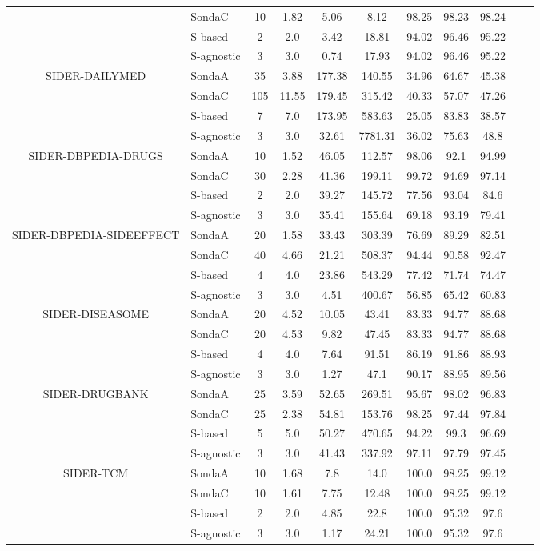 \begin{center}
\begin{table*}[h]
\begin{tabular}{|c|l|c|c|c|c|c|c|c|c|c|}
 & SondaC  & 10 & 1.82   & 5.06  & 8.12 & 98.25 & 98.23 & 98.24  \\
 & S-based  & 2 & 2.0   & 3.42  & 18.81 & 94.02 & 96.46 & 95.22  \\
 & S-agnostic  & 3 & 3.0   & 0.74  & 17.93 & 94.02 & 96.46 & 95.22  \\ \hline
\multirow{4}{*}{SIDER-DAILYMED}  & SondaA  & 35 & 3.88   & 177.38  & 140.55 & 34.96 & 64.67 & 45.38  \\
 & SondaC  & 105 & 11.55   & 179.45  & 315.42 & 40.33 & 57.07 & 47.26  \\
 & S-based  & 7 & 7.0   & 173.95  & 583.63 & 25.05 & 83.83 & 38.57  \\
 & S-agnostic  & 3 & 3.0   & 32.61  & 7781.31 & 36.02 & 75.63 & 48.8  \\ \hline
\multirow{4}{*}{SIDER-DBPEDIA-DRUGS}  & SondaA  & 10 & 1.52   & 46.05  & 112.57 & 98.06 & 92.1 & 94.99  \\
 & SondaC  & 30 & 2.28   & 41.36  & 199.11 & 99.72 & 94.69 & 97.14  \\
 & S-based  & 2 & 2.0   & 39.27  & 145.72 & 77.56 & 93.04 & 84.6  \\
 & S-agnostic  & 3 & 3.0   & 35.41  & 155.64 & 69.18 & 93.19 & 79.41  \\ \hline
\multirow{4}{*}{SIDER-DBPEDIA-SIDEEFFECT}  & SondaA  & 20 & 1.58   & 33.43  & 303.39 & 76.69 & 89.29 & 82.51  \\
 & SondaC  & 40 & 4.66   & 21.21  & 508.37 & 94.44 & 90.58 & 92.47  \\
 & S-based  & 4 & 4.0   & 23.86  & 543.29 & 77.42 & 71.74 & 74.47  \\
 & S-agnostic  & 3 & 3.0   & 4.51  & 400.67 & 56.85 & 65.42 & 60.83  \\ \hline
\multirow{4}{*}{SIDER-DISEASOME}  & SondaA  & 20 & 4.52   & 10.05  & 43.41 & 83.33 & 94.77 & 88.68  \\
 & SondaC  & 20 & 4.53   & 9.82  & 47.45 & 83.33 & 94.77 & 88.68  \\
 & S-based  & 4 & 4.0   & 7.64  & 91.51 & 86.19 & 91.86 & 88.93  \\
 & S-agnostic  & 3 & 3.0   & 1.27  & 47.1 & 90.17 & 88.95 & 89.56  \\ \hline
\multirow{4}{*}{SIDER-DRUGBANK}  & SondaA  & 25 & 3.59   & 52.65  & 269.51 & 95.67 & 98.02 & 96.83  \\
 & SondaC  & 25 & 2.38   & 54.81  & 153.76 & 98.25 & 97.44 & 97.84  \\
 & S-based  & 5 & 5.0   & 50.27  & 470.65 & 94.22 & 99.3 & 96.69  \\
 & S-agnostic  & 3 & 3.0   & 41.43  & 337.92 & 97.11 & 97.79 & 97.45  \\ \hline
\multirow{4}{*}{SIDER-TCM}  & SondaA  & 10 & 1.68   & 7.8  & 14.0 & 100.0 & 98.25 & 99.12  \\
 & SondaC  & 10 & 1.61   & 7.75  & 12.48 & 100.0 & 98.25 & 99.12  \\
 & S-based  & 2 & 2.0   & 4.85  & 22.8 & 100.0 & 95.32 & 97.6  \\
 & S-agnostic  & 3 & 3.0   & 1.17  & 24.21 & 100.0 & 95.32 & 97.6  \\ \hline					


\end{tabular}
\end{table*}
\end{center}
